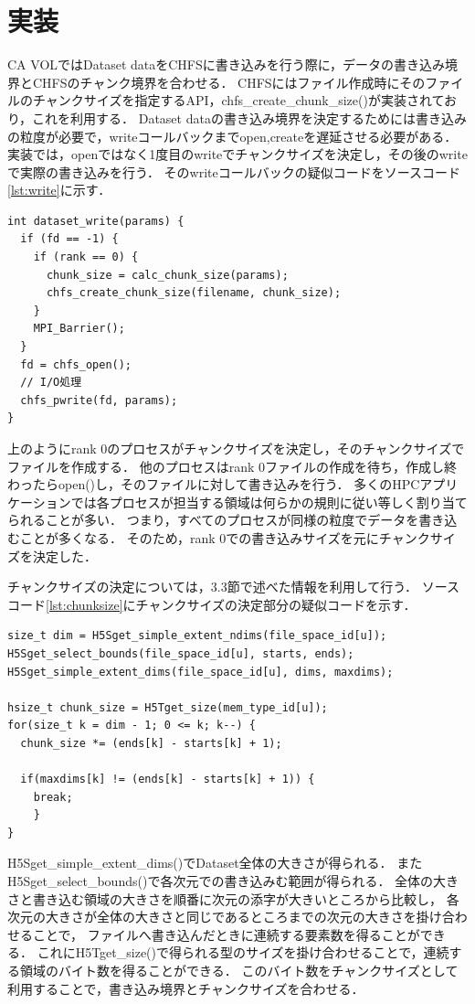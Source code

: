 \documentclass[submit,techrep,noauthor]{ipsj}
\begin{document}
\section{実装}
CA VOLではDataset dataをCHFSに書き込みを行う際に，データの書き込み境界とCHFSのチャンク境界を合わせる．
CHFSにはファイル作成時にそのファイルのチャンクサイズを指定するAPI，chfs\_create\_chunk\_size()が実装されており，これを利用する．
Dataset dataの書き込み境界を決定するためには書き込みの粒度が必要で，writeコールバックまでopen,createを遅延させる必要がある．
実装では，openではなく1度目のwriteでチャンクサイズを決定し，その後のwriteで実際の書き込みを行う．
そのwriteコールバックの疑似コードをソースコード\ref{lst:write}に示す．
\begin{lstlisting}[caption=dataset writeのコード,label=lst:write]
int dataset_write(params) {
  if (fd == -1) {
    if (rank == 0) {
      chunk_size = calc_chunk_size(params);
      chfs_create_chunk_size(filename, chunk_size);
    }
    MPI_Barrier();
  }
  fd = chfs_open();
  // I/O処理
  chfs_pwrite(fd, params);
}
\end{lstlisting}
上のようにrank 0のプロセスがチャンクサイズを決定し，そのチャンクサイズでファイルを作成する．
他のプロセスはrank 0ファイルの作成を待ち，作成し終わったらopen()し，そのファイルに対して書き込みを行う．
多くのHPCアプリケーションでは各プロセスが担当する領域は何らかの規則に従い等しく割り当てられることが多い．
つまり，すべてのプロセスが同様の粒度でデータを書き込むことが多くなる．
そのため，rank 0での書き込みサイズを元にチャンクサイズを決定した．

チャンクサイズの決定については，3.3節で述べた情報を利用して行う．
ソースコード\ref{lst:chunksize}にチャンクサイズの決定部分の疑似コードを示す．
\begin{lstlisting}[caption=チャンクサイズの決定部分のソースコード(抜粋),label=lst:chunksize]
size_t dim = H5Sget_simple_extent_ndims(file_space_id[u]);
H5Sget_select_bounds(file_space_id[u], starts, ends);
H5Sget_simple_extent_dims(file_space_id[u], dims, maxdims);

hsize_t chunk_size = H5Tget_size(mem_type_id[u]);
for(size_t k = dim - 1; 0 <= k; k--) {
  chunk_size *= (ends[k] - starts[k] + 1);

  if(maxdims[k] != (ends[k] - starts[k] + 1)) {
    break;
	}
}
\end{lstlisting}
H5Sget\_simple\_extent\_dims()でDataset全体の大きさが得られる．
またH5Sget\_select\_bounds()で各次元での書き込みむ範囲が得られる．
全体の大きさと書き込む領域の大きさを順番に次元の添字が大きいところから比較し，
各次元の大きさが全体の大きさと同じであるところまでの次元の大きさを掛け合わせることで，
ファイルへ書き込んだときに連続する要素数を得ることができる．
これにH5Tget\_size()で得られる型のサイズを掛け合わせることで，連続する領域のバイト数を得ることができる．
このバイト数をチャンクサイズとして利用することで，書き込み境界とチャンクサイズを合わせる．
\end{document}
